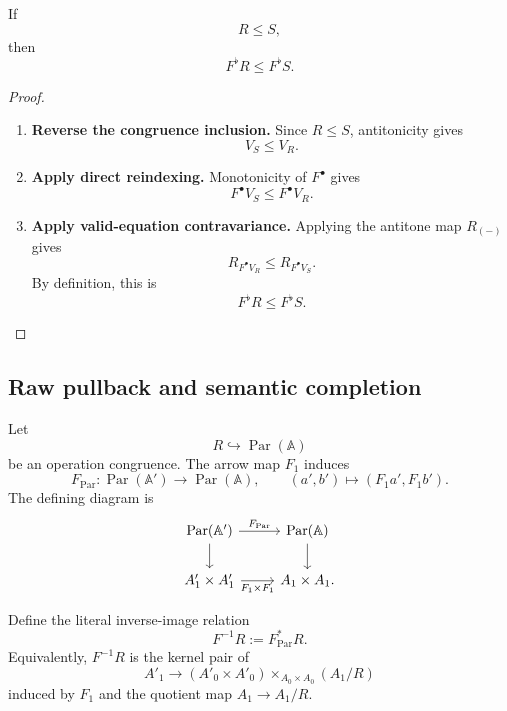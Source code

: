 \begin{proposition}
\label{prop:to-Fflat-monotone}
    If
    \[
        R\leq S,
    \]
    then
    \[
        F^\flat R
        \leq
        F^\flat S.
    \]
\end{proposition}

\begin{proof}
    \leavevmode
    \begin{enumerate}
        \item \textbf{Reverse the congruence inclusion.}
        Since \(R\leq S\), antitonicity gives
        \[
            V_S\leq V_R.
        \]

        \item \textbf{Apply direct reindexing.}
        Monotonicity of \(F^\bullet\) gives
        \[
            F^\bullet V_S
            \leq
            F^\bullet V_R.
        \]

        \item \textbf{Apply valid-equation contravariance.}
        Applying the antitone map \(R_{(-)}\) gives
        \[
            R_{F^\bullet V_R}
            \leq
            R_{F^\bullet V_S}.
        \]
        By definition, this is
        \[
            F^\flat R
            \leq
            F^\flat S.
        \]
    \end{enumerate}
\end{proof}

\subsection{Raw pullback and semantic completion}
\label{subsec:to-raw-pullback-semantic-completion}

Let
\[
    R\hookrightarrow\operatorname{Par}(\mathbb A)
\]
be an operation congruence. The arrow map \(F_1\) induces
\[
    F_{\operatorname{Par}}:
    \operatorname{Par}(\mathbb A')
    \to
    \operatorname{Par}(\mathbb A),
    \qquad
    (a',b')
    \longmapsto
    (F_1a',F_1b').
\]
The defining diagram is
\[
\begin{tikzcd}
    \operatorname{Par}(\mathbb A')
        \arrow[r, "F_{\operatorname{Par}}"]
        \arrow[d]
    &
    \operatorname{Par}(\mathbb A)
        \arrow[d]
    \\
    A'_1\times A'_1
        \arrow[r, "F_1\times F_1"']
    &
    A_1\times A_1.
\end{tikzcd}
\]

Define the literal inverse-image relation
\[
    F^{-1}R
    :=
    F_{\operatorname{Par}}^*R.
\]
Equivalently, \(F^{-1}R\) is the kernel pair of
\[
    A'_1
    \longrightarrow
    (A'_0\times A'_0)
    \times_{A_0\times A_0}
    (A_1/R)
\]
induced by \(F_1\) and the quotient map \(A_1\to A_1/R\).

